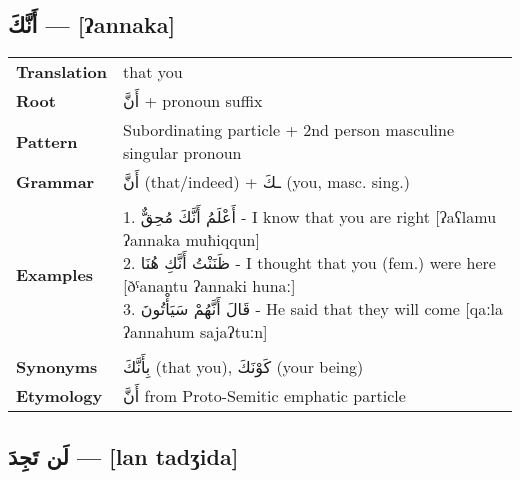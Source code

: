 \documentclass[letterpaper,12pt]{article}
\begin{document}
\subsection{\textarabic{أَنَّكَ} — [ʔannaka]}

\begin{tabular}{p{3cm}p{10cm}}
\toprule
\textbf{Translation} & that you \\
\textbf{Root} & \textarabic{أَنَّ} + pronoun suffix \\
\textbf{Pattern} & Subordinating particle + 2nd person masculine singular pronoun \\
\textbf{Grammar} & \textarabic{أَنَّ} (that/indeed) + \textarabic{ـكَ} (you, masc. sing.) \\
\midrule \\
\textbf{Examples} & \makecell[l]{\parbox{9.5cm}{
1. \textarabic{أَعْلَمُ أَنَّكَ مُحِقٌّ} - I know that you are right [ʔaʕlamu ʔannaka muħiqqun]\\
2. \textarabic{ظَنَنْتُ أَنَّكِ هُنَا} - I thought that you (fem.) were here [ðˤanantu ʔannaki hunaː]\\
3. \textarabic{قَالَ أَنَّهُمْ سَيَأْتُونَ} - He said that they will come [qaːla ʔannahum sajaʔtuːn]
}} \\
\midrule \\
\textbf{Synonyms} & \textarabic{بِأَنَّكَ} (that you), \textarabic{كَوْنَكَ} (your being) \\
\textbf{Etymology} & \textarabic{أَنَّ} from Proto-Semitic emphatic particle \\
\bottomrule
\end{tabular}

\subsection{\textarabic{لَن تَجِدَ} — [lan tadʒida]}
\end{document}
